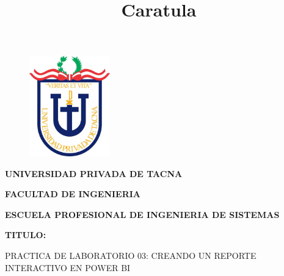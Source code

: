 \documentclass[12pt,letterpaper]{article}
\begin{document}
%

  
\title{Caratula}

\begin{titlepage}
    \begin{center}
    \begin{figure}[htb]
    \begin{center}
    \includegraphics[width=3.5cm]{./img/upt.jpg}
    \end{center}
    \end{figure}
    
    \vspace*{0.15in}
    \begin{Large}
    \textbf{UNIVERSIDAD PRIVADA DE TACNA}\\
    \end{Large}
    
    \vspace*{0.1in}
    \begin{Large}
    \textbf{FACULTAD DE INGENIERIA} \\
    \end{Large}
    
    \vspace*{0.1in}
    \begin{Large}
    \textbf{ESCUELA PROFESIONAL DE INGENIERIA DE SISTEMAS} \\
    \end{Large}
    
    \vspace*{0.5in}
    \begin{Large}
    \textbf{TITULO:}\\
    \end{Large}
    

\vspace*{0.1in}
\begin{Large}
    PRACTICA DE LABORATORIO 03: CREANDO UN REPORTE INTERACTIVO EN POWER BI \\
\end{Large}


\end{center}
\end{titlepage}
\end{document}
